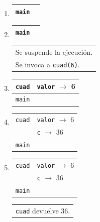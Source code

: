\begin{enumerate}

\item {}
	\begin{tabular}{r|l|}
	\hline
	\currentframe \verb|main| & \phantom{\verb|valor| $\rightarrow$ 5} \\
	\hline
	\end{tabular}

\item {}
	\begin{tabular}{r|l|}
	\hline
	\currentframe \verb|main| & \phantom{\verb|valor| $\rightarrow$ 5} \\
	\hline
	\end{tabular}
	\begin{tabular}{l}
	Se suspende la ejecución.\\
	Se invoca a \verb|cuad(6)|.
	\end{tabular}

\item {}
	\begin{tabular}{r|l|}
	\hline
	\currentframe \verb|cuad| & \verb|valor| $\rightarrow$ 6\\
	\hline
	\hline
	              \verb|main| & \\
	\hline
	\end{tabular}
	\hspace{1cm}

\item {}
	\begin{tabular}{r|l|}
	\hline
	\currentframe \verb|cuad|&\verb|valor| $\rightarrow$ 6\\
	                         &\verb|c| $\rightarrow$ 36\\
	\hline
	\hline
	              \verb|main| & \\
	\hline
	\end{tabular}

\item {}
	\begin{tabular}{r|l|}
	\hline
	\currentframe \verb|cuad|&\verb|valor| $\rightarrow$ 6\\
	                         &\verb|c| $\rightarrow$ 36\\
	\hline
	\hline
	              \verb|main| & \\
	\hline
	\end{tabular}
	\begin{tabular}{l}
	\verb|cuad| devuelve 36.\\
	\end{tabular}


\end{enumerate}
